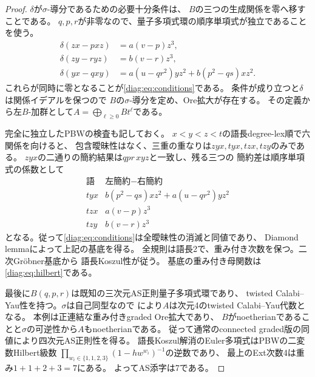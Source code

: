 \documentclass[11pt,a4paper]{ltjsarticle}
\theoremstyle{definition}
\begin{document}
\begin{proof}
$\delta$が$\sigma$-導分であるための必要十分条件は、
$B$の三つの生成関係を零へ移すことである。
$q,p,r$が非零なので、量子多項式環の順序単項式が独立であることを使う。
\begin{align*}
\delta(zx-pxz)&=a(v-p)z^3,\\
\delta(zy-ryz)&=b(v-r)z^3,\\
\delta(yx-qxy)&=a(u-qr^2)yz^2+b(p^2-qs)xz^2.
\end{align*}
これらが同時に零となることが\eqref{diag:eq:conditions}である。
条件が成り立つと$\delta$は関係イデアルを保つので
$B$の$\sigma$-導分を定め、Ore拡大が存在する。
その定義から左$B$-加群として$A=\bigoplus_{\ell\geq0}Bt^\ell$である。

完全に独立したPBWの検査も記しておく。
$x<y<z<t$の語長degree-lex順で六関係を向けると、
包含曖昧性はなく、三重の重なりは$zyx,tyx,tzx,tzy$のみである。
$zyx$の二通りの簡約結果は$qpr\,xyz$と一致し、残る三つの
簡約差は順序単項式の係数として
\begin{equation}\label{diag:eq:ambiguities}
\begin{array}{c|l}
\text{語} & \text{左簡約}-\text{右簡約}\\ \hline
 tyx & b(p^2-qs)xz^2+a(u-qr^2)yz^2\\
 tzx & a(v-p)z^3\\
 tzy & b(v-r)z^3
\end{array}
\end{equation}
となる。従って\eqref{diag:eq:conditions}は全曖昧性の消滅と同値であり、
Diamond lemma\cite[Theorem~1.2]{Bergman}によって上記の基底を得る。
全規則は語長2で、重み付き次数を保つ。二次Gr\"obner基底から
語長Koszul性が従う\cite{Priddy}。
基底の重み付き母関数は\eqref{diag:eq:hilbert}である。

最後に$B(q,p,r)$は既知の三次元AS正則量子多項式環であり、
twisted Calabi--Yau性を持つ。$\sigma$は自己同型なので
\cite[Theorem~3.3]{LWW}により$A$は次元4のtwisted Calabi--Yau代数となる。
本例は正連結な重み付きgraded Ore拡大であり、
$B$がnoetherianであることと$\sigma$の可逆性から$A$もnoetherianである。
従って通常のconnected graded版の同値により四次元AS正則性を得る。
語長Koszul解消のEuler多項式はPBWの二変数Hilbert級数
$\prod_{w_i\in\{1,1,2,3\}}(1-h w^{w_i})^{-1}$の逆数であり、
最上のExt次数4は重み$1+1+2+3=7$にある。
よってAS添字は7である。
\end{proof}
\end{document}
